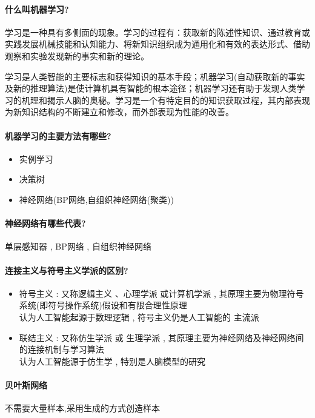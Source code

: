 \documentclass[UTF8,a4paper]{ctexart}
\begin{document}
\paragraph{什么叫机器学习?}
学习是一种具有多侧面的现象。学习的过程有：获取新的陈述性知识、通过教育或实践发展机械技能和认知能力、将新知识组织成为通用化和有效的表达形式、借助观察和实验发现新的事实和新的理论。

学习是人类智能的主要标志和获得知识的基本手段；机器学习(自动获取新的事实及新的推理算法)是使计算机具有智能的根本途径；机器学习还有助于发现人类学习的机理和揭示人脑的奥秘。学习是一个有特定目的的知识获取过程，其内部表现为新知识结构的不断建立和修改，而外部表现为性能的改善。

\paragraph{机器学习的主要方法有哪些?}
\begin{itemize}
	\item 实例学习
	\item 决策树
	\item 神经网络(BP网络,自组织神经网络(聚类))
\end{itemize}

\paragraph{神经网络有哪些代表?}单层感知器 , BP网络 , 自组织神经网络

\paragraph{连接主义与符号主义学派的区别?}
\begin{itemize}
	\item 符号主义 : 又称逻辑主义 、心理学派 或计算机学派 , 其原理主要为物理符号系统(即符号操作系统)假设和有限合理性原理\\
认为人工智能起源于数理逻辑 , 符号主义仍是人工智能的 主流派
\item 联结主义 : 又称仿生学派 或 生理学派 , 其原理主要为神经网络及神经网络间的连接机制与学习算法\\
认为人工智能源于仿生学 , 特别是人脑模型的研究
\end{itemize}

\paragraph{贝叶斯网络}
不需要大量样本,采用生成的方式创造样本
\end{document}
